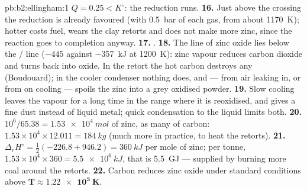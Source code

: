 \begin{solution}{pb:b2:ellingham:1}
$Q = 0.25 < K^\circ$: the reduction runs.
\textbf{16.} Just above the crossing the reduction is already favoured (with
\qty{0.5}{bar} of each gas, from about \qty{1170}{K}); hotter costs fuel,
wears the clay retorts and does not make more zinc, since the reaction goes to
completion anyway.
\textbf{17.} .
\textbf{18.} The line of zinc oxide lies below the / line
($-445$ against \qty{-357}{kJ} at \qty{1200}{K}): zinc vapour reduces carbon
dioxide and turns back into oxide. In the retort the hot carbon destroys any
 (Boudouard); in the cooler condenser nothing does, and  --- from
air leaking in, or from  on cooling --- spoils the zinc into a
grey oxidised powder.
\textbf{19.} Slow cooling leaves the vapour for a long time in the range where
it is reoxidised, and gives a fine dust instead of liquid metal; quick
condensation to the liquid limits both.
\textbf{20.} $10^6/65.38 = \qty{1.53e4}{mol}$ of zinc, as many of carbon:
$1.53 \times 10^4 \times 12.011 = \qty{184}{kg}$ (much more in practice, to heat the
retorts).
\textbf{21.} $\Delta_r H^\circ = \frac12(-226.8 + 946.2) = \qty{+360}{kJ}$ per
mole of zinc; per tonne, $1.53 \times 10^4 \times 360 = \qty{5.5e6}{kJ}$, that is
\qty{5.5}{GJ} --- supplied by burning more coal around the retorts.
\textbf{22.} Carbon reduces zinc oxide under standard conditions above
$\boldsymbol{T \approx \qty{1.22e3}{K}}$.
\end{solution}
